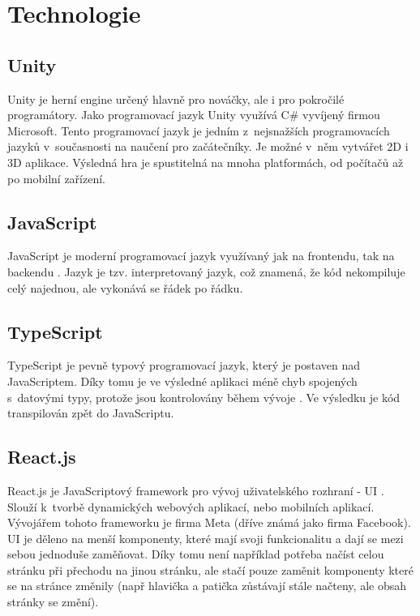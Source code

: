 \section{Technologie}

\subsection{Unity}
Unity je herní engine určený hlavně pro nováčky, ale i pro pokročilé programátory. Jako programovací jazyk Unity využívá C\# vyvíjený firmou Microsoft. Tento programovací jazyk je jedním z~nejsnažších programovacích jazyků v~současnosti na naučení pro začátečníky. \cite{Csharp} Je možné v~něm vytvářet 2D i 3D aplikace. Výsledná hra je spustitelná na mnoha platformách, od počítačů až po mobilní zařízení.

\subsection{JavaScript}
JavaScript je moderní programovací jazyk využívaný jak na frontendu, tak na backendu \cite{JavaScript}. Jazyk je tzv. interpretovaný jazyk, což znamená, že kód nekompiluje celý najednou, ale vykonává se řádek po řádku.

\subsection{TypeScript}
TypeScript je pevně typový programovací jazyk, který je postaven nad JavaScriptem. \cite{TypeScript} Díky tomu je ve výsledné aplikaci méně chyb spojených s~datovými typy, protože jsou kontrolovány během vývoje \cite{TypeScript}. Ve výsledku je kód transpilován zpět do JavaScriptu.

\subsection{React.js}
React.js je JavaScriptový framework pro vývoj uživatelského rozhraní - UI \cite{React}. Slouží k~tvorbě dynamických webových aplikací, nebo mobilních aplikací. Vývojářem tohoto frameworku je firma Meta (dříve známá jako firma Facebook). UI je děleno na menší komponenty, které mají svoji funkcionalitu a dají se mezi sebou jednoduše zaměňovat. Díky tomu není například potřeba načíst celou stránku při přechodu na jinou stránku, ale stačí pouze zaměnit komponenty které se na stránce změnily (např hlavička a patička zůstávají stále načteny, ale obsah stránky se změní).

